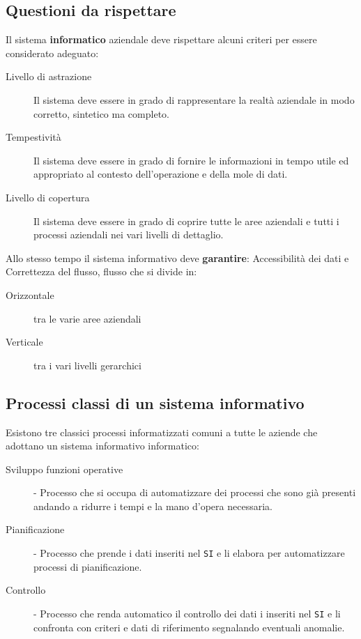     \subsection{Questioni da rispettare} 
        Il sistema \textbf{informatico} aziendale deve rispettare alcuni criteri per essere considerato adeguato:
        \begin{description}
            \item[Livello di astrazione] Il sistema deve essere in grado di rappresentare la realtà aziendale in modo corretto, sintetico ma completo.
            \item[Tempestività] Il sistema deve essere in grado di fornire le informazioni in tempo utile ed appropriato al contesto dell'operazione e della mole di dati.
            \item[Livello di copertura] Il sistema deve essere in grado di coprire tutte le aree aziendali e tutti i processi aziendali nei vari livelli di dettaglio.
        \end{description}
        Allo stesso tempo il sistema informativo deve \textbf{garantire}: Accessibilità dei dati e Correttezza del flusso, flusso che si divide in:
        \begin{description}
            \item[Orizzontale] tra le varie aree aziendali
            \item[Verticale] tra i vari livelli gerarchici
        \end{description}
    \subsection{Processi classi di un sistema informativo}
        Esistono tre classici processi informatizzati comuni a tutte le aziende che adottano un sistema informativo informatico:
        \begin{description}
            \item[Sviluppo funzioni operative] - Processo che si occupa di automatizzare dei processi che sono già presenti andando a ridurre i tempi e la mano d'opera necessaria.
            \item[Pianificazione] - Processo che prende i dati inseriti nel \texttt{SI} e li elabora per automatizzare processi di pianificazione.
            \item[Controllo] - Processo che renda automatico il controllo dei dati i inseriti nel \texttt{SI} e li confronta con criteri e dati di riferimento segnalando eventuali anomalie.
        \end{description}
    \label{subsec:nuoviProcessi}
